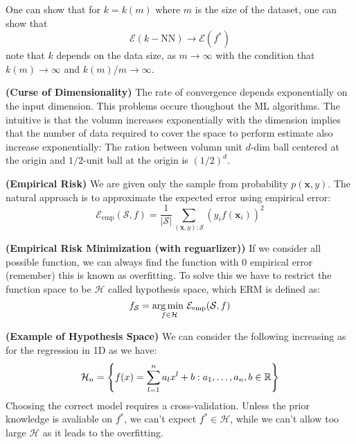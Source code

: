 \begin{remark}
    One can show that for $k = k(m)$ where $m$ is the size of the dataset, one can show that 
    \begin{equation*}
        \mathcal{E}(k-\text{NN}) \rightarrow \mathcal{E}(f^*)
    \end{equation*}
    note that $k$ depends on the data size, as $m\rightarrow\infty$ with the condition that $k(m)\rightarrow \infty$ and $k(m)/m\rightarrow\infty$.
\end{remark}

\begin{remark}{\textbf{(Curse of Dimensionality)}}
    The rate of convergence depends exponentially on the input dimension. This problems occure thoughout the ML algorithms. The intuitive is that the volumn increases exponentially with the dimension implies that the number of data required to cover the space to perform estimate also increase exponentially: The ration between volumn unit $d$-dim ball centered at the origin and $1/2$-unit ball at the origin is $(1/2)^d$. 
\end{remark}

\begin{definition}{\textbf{(Empirical Risk)}} 
    We are given only the sample from probability $p(\boldsymbol x, y)$. The natural approach is to approximate the expected error using empirical error:
    \begin{equation*}
        \mathcal{E}_\text{emp}(\mathcal{S}, f) = \frac{1}{|\mathcal{S}|}\sum_{(\boldsymbol x, y) : \mathcal{S}} (y_i f(\boldsymbol x_i))^2
    \end{equation*}
\end{definition}

\begin{definition}{\textbf{(Empirical Risk Minimization (with reguarlizer))}}
    If we consider all possible function, we can always find the function with $0$ empirical error (remember) this is known as overfitting. To solve this we have to restrict the function space to be $\mathcal{H}$ called hypothesis space, which ERM is defined as:
    \begin{equation*}
        f_\mathcal{S} = \underset{f\in\mathcal{H}}{\arg\min \ }\mathcal{E}_\text{emp}(\mathcal{S}, f)
    \end{equation*}
\end{definition}

\begin{remark}{\textbf{(Example of Hypothesis Space)}}
    We can consider the following increasing  as for the regression in 1D as we have:
    \begin{equation*}
        \mathcal{H}_n = \left\{ f(x) = \sum^n_{l=1} a_lx^l + b : a_1,\dots,a_n,b\in \mathbb{R} \right\}
    \end{equation*}
    Choosing the correct model requires a cross-validation. Unless the prior knowledge is avaliable on $f^*$, we can't expect $f^*\in \mathcal{H}$, while we can't allow too large $\mathcal{H}$ as it leads to the overfitting.
\end{remark}


